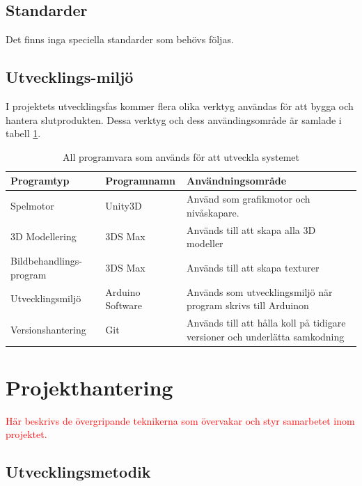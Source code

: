 \documentclass[a4paper,12pt,oneside,final]{extbook}
\begin{document}
\section{Standarder}
Det finns inga speciella standarder som behövs följas.

\section{Utvecklings-miljö}



I projektets utvecklingsfas kommer flera olika verktyg användas för att bygga och hantera slutprodukten. Dessa verktyg och dess användingsområde är samlade i tabell \ref{utvecklingsmiljö}. 


\begin{table}[h]
	\centering
	\caption{All programvara som används för att utveckla systemet}
	\label{utvecklingsmiljö}
	\begin{tabular}{ | p{9em} | m{6em} |p{23em}| } 
		\hline
		\textbf{Programtyp}&\textbf{Programnamn}  &\textbf{ Användningsområde} \\ 
		\hline
		Spelmotor &Unity3D & Använd som grafikmotor och nivåskapare. \\ 
		\hline
		3D Modellering &3DS Max &Används till att skapa alla 3D modeller  \\ 
		\hline
		Bildbehandlings-program &3DS Max &Används till att skapa texturer  \\ 
		\hline
		Utvecklingsmiljö &Arduino Software &Används som utvecklingsmiljö när program skrivs till Arduinon  \\ 
		\hline
		Versionshantering &Git &Används till att hålla koll på tidigare versioner och underlätta samkodning  \\ 
		\hline

	\end{tabular}
\end{table}

	



\chapter{Projekthantering}


\textcolor{red}{Här beskrivs de övergripande teknikerna som övervakar och styr samarbetet inom projektet.}

\section{Utvecklingsmetodik}
\end{document}
